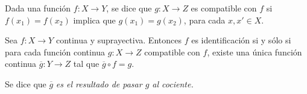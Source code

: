 
\begin{definition}
Dada una función $f : X \longrightarrow Y$, se dice que $g : X \longrightarrow Z$ es compatible con $f$ si $f(x_1) = f(x_2)$ implica que $g(x_1) = g(x_2)$, para cada $x, x' \in X$. 
\end{definition}

\begin{theorem}
Sea $f : X \longrightarrow Y$ continua y suprayectiva. Entonces $f$ es identificación si y sólo si para cada función continua $g : X \longrightarrow Z$ compatible con $f$, existe una única función continua $\overline{g} : Y \longrightarrow Z$ tal que $\overline{g} \circ f = g$.
\bigskip

\bigskip

Se dice que $\overline{g}$ \itshape{es el resultado de pasar $g$ al cociente.}

\end{theorem}

